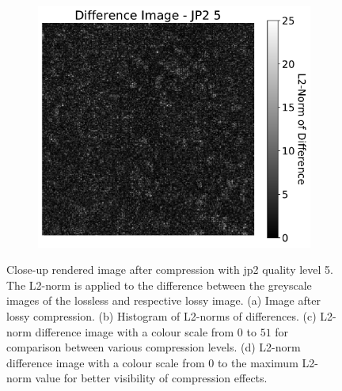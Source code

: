 \begin{figure}[htb]
\begin{subfigure}[b]{0.48\textwidth}
        \caption{}
        \label{fig:img_quality_comp_jp2_5_center_diff}
    \end{subfigure}
    \begin{subfigure}[b]{0.48\textwidth}
        \centering
        \includegraphics[width=\textwidth]{doc/thesis/0_figures/compare_quality/set1/jp2_5_center_diff_heatmap_rel}
        \caption{}
        \label{fig:img_quality_comp_jp2_5_center_diff_rel}
    \end{subfigure}
    \caption{Close-up rendered image after compression with \gls{jp2} quality level 5. The L2-norm is applied to the difference between the greyscale images of the lossless and respective lossy image. (a) Image after lossy compression. (b) Histogram of L2-norms of differences. (c) L2-norm difference image with a colour scale from $0$ to $51$ for comparison between various compression levels. (d) L2-norm difference image with a colour scale from $0$ to the maximum L2-norm value for better visibility of compression effects.}
    \label{fig:img_quality_comp_jp2_5_center}
\end{figure}

